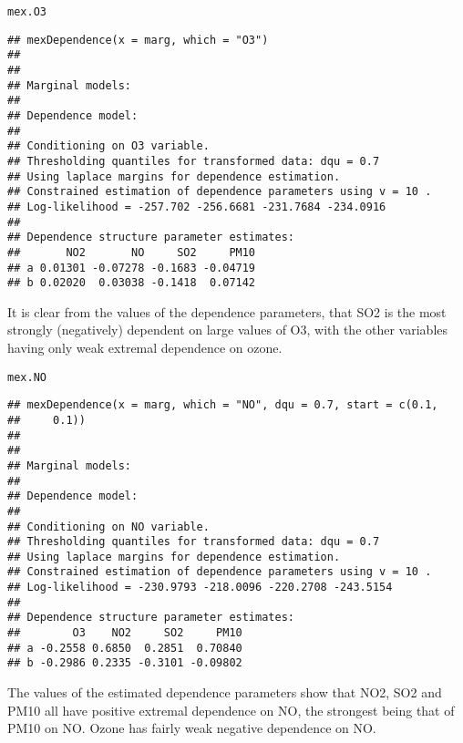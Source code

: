 \documentclass[10pt]{article}\usepackage[]{graphicx}\usepackage[]{color}
\makeatletter
\newcommand{\hlstd}[1]{\textcolor[rgb]{0.345,0.345,0.345}{#1}}%
\newenvironment{kframe}{%
 \def\at@end@of@kframe{}%
 \ifinner\ifhmode%
  \def\at@end@of@kframe{\end{minipage}}%
  \begin{minipage}{\columnwidth}%
 \fi\fi%
 \def\FrameCommand##1{\hskip\@totalleftmargin \hskip-\fboxsep
 \colorbox{shadecolor}{##1}\hskip-\fboxsep
     \hskip-\linewidth \hskip-\@totalleftmargin \hskip\columnwidth}%
 \MakeFramed {\advance\hsize-\width
   \@totalleftmargin\z@ \linewidth\hsize
   \@setminipage}}%
 {\par\unskip\endMakeFramed%
 \at@end@of@kframe}
\newenvironment{knitrout}{}{} %
\makeatother
\begin{document}
\begin{knitrout}
\color{fgcolor}\begin{kframe}
\begin{alltt}
\hlstd{mex.O3}
\end{alltt}
\begin{verbatim}
## mexDependence(x = marg, which = "O3")
## 
## 
## Marginal models:
## 
## Dependence model:
## 
## Conditioning on O3 variable.
## Thresholding quantiles for transformed data: dqu = 0.7
## Using laplace margins for dependence estimation.
## Constrained estimation of dependence parameters using v = 10 .
## Log-likelihood = -257.702 -256.6681 -231.7684 -234.0916 
## 
## Dependence structure parameter estimates:
##       NO2       NO     SO2     PM10
## a 0.01301 -0.07278 -0.1683 -0.04719
## b 0.02020  0.03038 -0.1418  0.07142
\end{verbatim}
\end{kframe}
\end{knitrout}

It is clear from the values of the dependence parameters, that SO2 is the most
strongly (negatively) dependent on large values of O3, with the other variables
having only weak extremal dependence on ozone.



\begin{knitrout}
\color{fgcolor}\begin{kframe}
\begin{alltt}
\hlstd{mex.NO}
\end{alltt}
\begin{verbatim}
## mexDependence(x = marg, which = "NO", dqu = 0.7, start = c(0.1, 
##     0.1))
## 
## 
## Marginal models:
## 
## Dependence model:
## 
## Conditioning on NO variable.
## Thresholding quantiles for transformed data: dqu = 0.7
## Using laplace margins for dependence estimation.
## Constrained estimation of dependence parameters using v = 10 .
## Log-likelihood = -230.9793 -218.0096 -220.2708 -243.5154 
## 
## Dependence structure parameter estimates:
##        O3    NO2     SO2     PM10
## a -0.2558 0.6850  0.2851  0.70840
## b -0.2986 0.2335 -0.3101 -0.09802
\end{verbatim}
\end{kframe}
\end{knitrout}

The values of the estimated dependence parameters show that NO2, SO2 and PM10
all have positive extremal dependence on NO, the strongest being that of PM10 on
NO.  Ozone has fairly weak negative dependence on NO.
\end{document}
